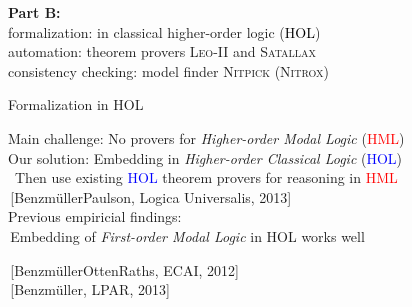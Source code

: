 \begin{transitionframe}{}
\textbf{Part B:} \\
\quad formalization: in classical higher-order logic (\textcolor{black}{HOL}) \\
\quad automation: theorem provers \textsc{Leo-II} and \textsc{Satallax} \\ 
\quad consistency checking: model finder \textsc{Nitpick (Nitrox)} \\
\end{transitionframe}

\begin{frame}{Formalization in HOL} \large

Main challenge: \hfill No provers for \emph{Higher-order Modal
  Logic\/} (\textcolor{red}{HML}) \\[1em]

Our solution: \hfill Embedding in \emph{Higher-order Classical
  Logic\/} (\textcolor{blue}{HOL}) \\
\, \hfill Then use existing \textcolor{blue}{HOL} theorem provers for reasoning in \textcolor{red}{HML} \\
\,\hfill {\small [Benzm\"ullerPaulson, Logica Universalis, 2013]}
\\[2em]

Previous empiricial findings:  \\[.5em]
\,\hfill Embedding of  \emph{First-order Modal Logic} in HOL works well 

\,\hfill {\small [Benzm\"ullerOttenRaths, ECAI, 2012]} \\
\,\hfill {\small [Benzm\"uller, LPAR, 2013]}
\end{frame}



